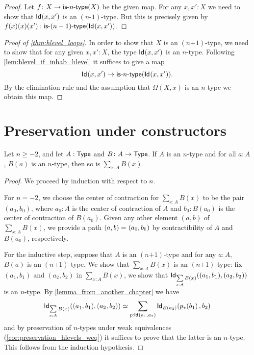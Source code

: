 \begin{proof}
  Let $f \colon X \to \istype{n}(X)$ be the given map. For any $x, x' : X$ we need to show that
     $\idtype{x}{x'}$ is an $(n \mbox{-} 1)$-type. But this is precisely given by
    $f(x)(x)(x') : \istype{(n-1)}(\idtype{x}{x'}) $.
\end{proof}


\begin{proof}[Proof of \autoref{thm:hlevel_loops}]
 In order to show that $X$ is an $(n\mbox{+}1)$-type, we need to show that for any given $x, x' : X$,
   the type $\idtype{x}{x'}$ is an $n$-type.
  Following \autoref{lem:hlevel_if_inhab_hlevel} it suffices to give a map
   \[ \idtype{x}{x'} \to \istype{n}(\idtype{x}{x'})  .\]
  By the elimination rule and the assumption that $\Omega(X, x)$ is an $n$-type we obtain this map.
\end{proof}

\section{Preservation under constructors}

\begin{thm}
 Let $n \geq -2$, and let $A : \type$ and $B \colon A \to \type$.
 If $A$ is an $n$-type and for all $a : A$, $B(a)$ is an $n$-type, then so is $\sum\limits_{x : A} B(x)$.
\end{thm}

\begin{proof}
 We proceed by induction with respect to $n$.

 For $n = -2$, we choose the center of contraction for $\sum\limits_{x : A} B(x)$ to be the pair
       $(a_0, b_0)$, where $a_0 : A$ is the center of contraction of $A$ and $b_0 : B(a_0)$ is the center of contraction of $B(a_0)$.
       Given any other element $(a,b)$ of $\sum\limits_{x : A} B(x)$, we provide a path $\id{(a, b)}{(a_0,b_0)}$
       by contractibility of $A$ and $B(a_0)$, respectively.

 For the inductive step, suppose that $A$ is an $(n\mbox{+}1)$-type and
         for any $a : A$, $B(a)$ is an $(n \mbox{+} 1)$-type. We show that $\sum\limits_{x : A} B(x)$ is an $(n \mbox{+} 1)$-type:
      fix $(a_1, b_1)$ and $(a_2,b_2)$ in $\sum\limits_{x : A} B(x)$,
     we show that $\idtype[\sum\limits_{x : A} B(x)]{(a_1, b_1)}{(a_2,b_2)}$ is an $n$-type.
      By \autoref{lemma_from_another_chapter} we have
      \[ \eqv{\idtype[\sum\limits_{x : A} B(x)]{(a_1, b_1)}{(a_2,b_2)}}{\sum_{p : \idtype{a_1}{a_2}} \idtype[B(a_2)]{\trans{p}{b_1}}{b_2}} \]
   and by preservation of $n$-types under weak equivalences (\autoref{cor:preservation_hlevels_weq})
   it suffices to prove that the latter is an $n$-type. This follows from the
   induction hypothesis.
\end{proof}


